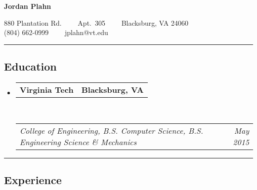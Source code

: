 \documentclass[10pt,letterpaper]{article}
\makeatletter
\newcommand{\headerrow}[2]
{\begin{tabular*}{\linewidth}{l@{\extracolsep{\fill}}r}
	#1 &
	#2 \\
\end{tabular*}}
\makeatother
\begin{document}
\begin{center}
{\LARGE \textbf{Jordan Plahn}}

880 Plantation Rd.\ \ \textbullet
\ \ Apt.\ 305\ \ \textbullet
\ \ Blacksburg, VA 24060
\\
(804) 662-0999\ \ \textbullet
\ \ jplahn@vt.edu
\end{center}


\hrule
\vspace{-0.4em}
\subsection*{Education}

\begin{itemize}
	\parskip=0.1em

	\item 
	\headerrow
		{\textbf{Virginia Tech}}
		{\textbf{Blacksburg, VA}}
	\\
	\headerrow
		{\emph{College of Engineering, B.S. Computer Science, B.S. Engineering Science \& Mechanics}}
		{\emph{May 2015}}

\end{itemize}


\hrule
\vspace{-0.4em}
\subsection*{Experience}
\end{document}
